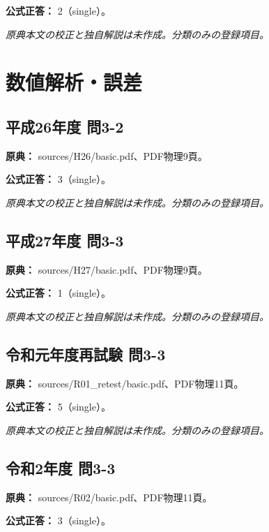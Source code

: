 \textbf{公式正答：} 2（single）。

\par\textit{原典本文の校正と独自解説は未作成。分類のみの登録項目。}

\section{数値解析・誤差}

\subsection{平成26年度 問3-2}
\label{q:h26-reg-basic-3-2}

\noindent\textbf{原典：} sources/H26/basic.pdf、PDF物理9頁。

\textbf{公式正答：} 3（single）。

\par\textit{原典本文の校正と独自解説は未作成。分類のみの登録項目。}

\subsection{平成27年度 問3-3}
\label{q:h27-reg-basic-3-3}

\noindent\textbf{原典：} sources/H27/basic.pdf、PDF物理9頁。

\textbf{公式正答：} 1（single）。

\par\textit{原典本文の校正と独自解説は未作成。分類のみの登録項目。}

\subsection{令和元年度再試験 問3-3}
\label{q:r01-ret-basic-3-3}

\noindent\textbf{原典：} sources/R01\_retest/basic.pdf、PDF物理11頁。

\textbf{公式正答：} 5（single）。

\par\textit{原典本文の校正と独自解説は未作成。分類のみの登録項目。}

\subsection{令和2年度 問3-3}
\label{q:r02-reg-basic-3-3}

\noindent\textbf{原典：} sources/R02/basic.pdf、PDF物理11頁。

\textbf{公式正答：} 3（single）。

